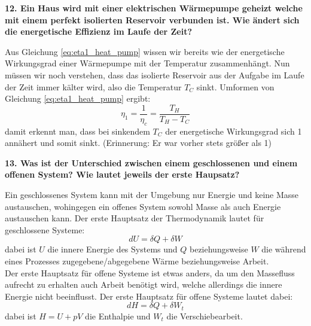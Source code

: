\noindent \textbf{12. Ein Haus wird mit einer elektrischen Wärmepumpe geheizt welche mit einem perfekt isolierten Reservoir verbunden ist. Wie ändert sich die energetische Effizienz im Laufe der Zeit?}\\
\begin{addmargin}[25pt]{0pt}
    Aus Gleichung \ref{eq:eta1_heat_pump} wissen wir bereits wie der energetische Wirkungsgrad einer Wärmepumpe mit der Temperatur zusammenhängt. Nun müssen wir noch verstehen, dass das isolierte Reservoir aus der Aufgabe im Laufe der Zeit immer kälter wird, also die Temperatur $T_C$ sinkt. Umformen von Gleichung \ref{eq:eta1_heat_pump} ergibt: 
    \begin{equation}
        \eta_1 = \frac{1}{\eta_c} = \frac{T_{H}}{T_{H} - T_{C}}
    \end{equation}
    damit erkennt man, dass bei sinkendem $T_C$ der energetische Wirkungsgrad sich 1 annähert und somit sinkt. (Erinnerung: Er war vorher stets größer als 1)\\
\end{addmargin}

\noindent \textbf{13. Was ist der Unterschied zwischen einem geschlossenen und einem offenen System? Wie lautet jeweils der erste Haupsatz?}\\
\begin{addmargin}[25pt]{0pt}
Ein geschlossenes System kann mit der Umgebung nur Energie und keine Masse austauschen, wohingegen ein offenes System sowohl Masse als auch Energie austauschen kann. Der erste Hauptsatz der Thermodynamik lautet für geschlossene Systeme:
\begin{equation}\label{eq:1.HS_geschlossen}
    \si{d}U = \delta Q + \delta W
\end{equation}
dabei ist $U$ die innere Energie des Systems und $Q$ beziehungsweise $W$ die während eines Prozesses zugegebene/abgegebene Wärme beziehungsweise Arbeit.\\
Der erste Hauptsatz für offene Systeme ist etwas anders, da um den Massefluss aufrecht zu erhalten auch Arbeit benötigt wird, welche allerdings die innere Energie nicht beeinflusst. Der erste Hauptsatz für offene Systeme lautet dabei:
\begin{equation}\label{eq:1.HS_offen}
    \si{d}H = \delta Q + \delta W_t
\end{equation}
dabei ist $H = U + pV$ die Enthalpie und $W_t$ die Verschiebearbeit.\\
\end{addmargin}


